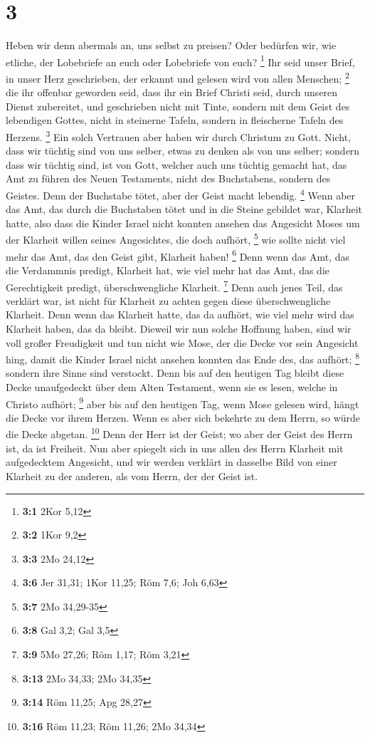 \hypertarget{section-2}{%
\section{3}\label{section-2}}

 Heben wir denn abermals an, uns selbst zu preisen? Oder
bedürfen wir, wie etliche, der Lobebriefe an euch oder Lobebriefe von
euch? \footnote{\textbf{3:1} 2Kor 5,12}  Ihr seid unser
Brief, in unser Herz geschrieben, der erkannt und gelesen wird von allen
Menschen; \footnote{\textbf{3:2} 1Kor 9,2}  die ihr
offenbar geworden seid, dass ihr ein Brief Christi seid, durch unseren
Dienst zubereitet, und geschrieben nicht mit Tinte, sondern mit dem
Geist des lebendigen Gottes, nicht in steinerne Tafeln, sondern in
fleischerne Tafeln des Herzens. \footnote{\textbf{3:3} 2Mo 24,12}
 Ein solch Vertrauen aber haben wir durch Christum zu
Gott.  Nicht, dass wir tüchtig sind von uns selber, etwas
zu denken als von uns selber; sondern dass wir tüchtig sind, ist von
Gott,  welcher auch uns tüchtig gemacht hat, das Amt zu
führen des Neuen Testaments, nicht des Buchstabens, sondern des Geistes.
Denn der Buchstabe tötet, aber der Geist macht lebendig. \footnote{\textbf{3:6}
  Jer 31,31; 1Kor 11,25; Röm 7,6; Joh 6,63}  Wenn aber das
Amt, das durch die Buchstaben tötet und in die Steine gebildet war,
Klarheit hatte, also dass die Kinder Israel nicht konnten ansehen das
Angesicht Moses um der Klarheit willen seines Angesichtes, die doch
aufhört, \footnote{\textbf{3:7} 2Mo 34,29-35}  wie sollte
nicht viel mehr das Amt, das den Geist gibt, Klarheit haben! \footnote{\textbf{3:8}
  Gal 3,2; Gal 3,5}  Denn wenn das Amt, das die Verdammnis
predigt, Klarheit hat, wie viel mehr hat das Amt, das die Gerechtigkeit
predigt, überschwengliche Klarheit. \footnote{\textbf{3:9} 5Mo 27,26;
  Röm 1,17; Röm 3,21}  Denn auch jenes Teil, das verklärt
war, ist nicht für Klarheit zu achten gegen diese überschwengliche
Klarheit.  Denn wenn das Klarheit hatte, das da aufhört,
wie viel mehr wird das Klarheit haben, das da bleibt. 
Dieweil wir nun solche Hoffnung haben, sind wir voll großer Freudigkeit
 und tun nicht wie Mose, der die Decke vor sein Angesicht
hing, damit die Kinder Israel nicht ansehen konnten das Ende des, das
aufhört; \footnote{\textbf{3:13} 2Mo 34,33; 2Mo 34,35} 
sondern ihre Sinne sind verstockt. Denn bis auf den heutigen Tag bleibt
diese Decke unaufgedeckt über dem Alten Testament, wenn sie es lesen,
welche in Christo aufhört; \footnote{\textbf{3:14} Röm 11,25; Apg 28,27}
 aber bis auf den heutigen Tag, wenn Mose gelesen wird,
hängt die Decke vor ihrem Herzen.  Wenn es aber sich
bekehrte zu dem Herrn, so würde die Decke abgetan. \footnote{\textbf{3:16}
  Röm 11,23; Röm 11,26; 2Mo 34,34}  Denn der Herr ist der
Geist; wo aber der Geist des Herrn ist, da ist Freiheit. 
Nun aber spiegelt sich in uns allen des Herrn Klarheit mit aufgedecktem
Angesicht, und wir werden verklärt in dasselbe Bild von einer Klarheit
zu der anderen, als vom Herrn, der der Geist ist.

